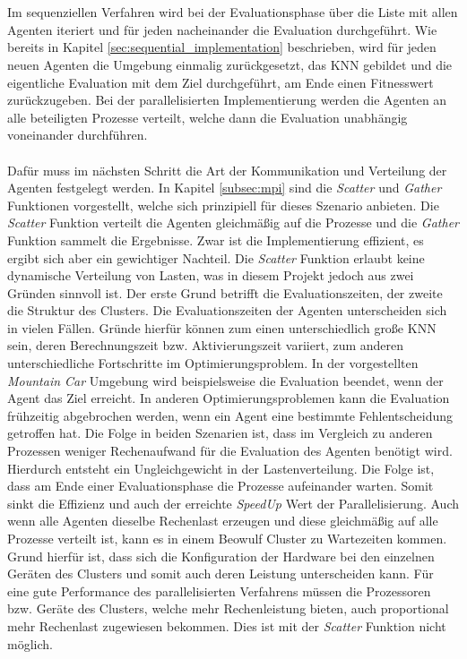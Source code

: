\\\\
Im sequenziellen Verfahren wird bei der Evaluationsphase über die Liste mit allen Agenten iteriert und für jeden nacheinander die Evaluation durchgeführt. Wie bereits in Kapitel \ref{sec:sequential_implementation} beschrieben, wird für jeden neuen Agenten die Umgebung einmalig zurückgesetzt, das \ac{KNN} gebildet und die eigentliche Evaluation mit dem Ziel durchgeführt, am Ende einen Fitnesswert zurückzugeben. Bei der parallelisierten Implementierung werden die Agenten an alle beteiligten Prozesse verteilt, welche dann die Evaluation unabhängig voneinander durchführen. 
\\\\
Dafür muss im nächsten Schritt die Art der Kommunikation und Verteilung der Agenten festgelegt werden. In Kapitel \ref{subsec:mpi} sind die \emph{Scatter} und \emph{Gather} Funktionen vorgestellt, welche sich prinzipiell für dieses Szenario anbieten. Die \emph{Scatter} Funktion verteilt die Agenten gleichmäßig auf die Prozesse und die \emph{Gather} Funktion sammelt die Ergebnisse. Zwar ist die Implementierung effizient, es ergibt sich aber ein gewichtiger Nachteil. Die \emph{Scatter} Funktion erlaubt keine dynamische Verteilung von Lasten, was in diesem Projekt jedoch aus zwei Gründen sinnvoll ist. Der erste Grund betrifft die Evaluationszeiten, der zweite die Struktur des Clusters. Die Evaluationszeiten der Agenten unterscheiden sich in vielen Fällen. Gründe hierfür können zum einen unterschiedlich große \ac{KNN} sein, deren Berechnungszeit bzw. Aktivierungszeit variiert, zum anderen unterschiedliche Fortschritte im Optimierungsproblem. In der vorgestellten \emph{Mountain Car} Umgebung wird beispielsweise die Evaluation beendet, wenn der Agent das Ziel erreicht. In anderen Optimierungsproblemen kann die Evaluation frühzeitig abgebrochen werden, wenn ein Agent eine bestimmte Fehlentscheidung getroffen hat. Die Folge in beiden Szenarien ist, dass im Vergleich zu anderen Prozessen weniger Rechenaufwand für die Evaluation des Agenten benötigt wird. Hierdurch entsteht ein Ungleichgewicht in der Lastenverteilung. Die Folge ist, dass am Ende einer Evaluationsphase die Prozesse aufeinander warten. Somit sinkt die Effizienz und auch der erreichte \emph{SpeedUp} Wert der Parallelisierung. Auch wenn alle Agenten dieselbe Rechenlast erzeugen und diese gleichmäßig auf alle Prozesse verteilt ist, kann es in einem Beowulf Cluster zu Wartezeiten kommen. Grund hierfür ist, dass sich die Konfiguration der Hardware bei den einzelnen Geräten des Clusters und somit auch deren Leistung unterscheiden kann. Für eine gute Performance des parallelisierten Verfahrens müssen die Prozessoren bzw. Geräte des Clusters, welche mehr Rechenleistung bieten, auch proportional mehr Rechenlast zugewiesen bekommen. Dies ist mit der \emph{Scatter} Funktion nicht möglich.
